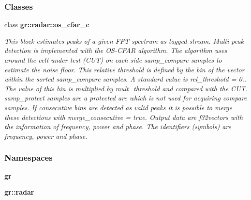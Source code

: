 \subsubsection*{Classes}
\begin{DoxyCompactItemize}
\item 
class {\bf gr\+::radar\+::os\+\_\+cfar\+\_\+c}
\begin{DoxyCompactList}\small\item\em This block estimates peaks of a given F\+FT spectrum as tagged stream. Multi peak detection is implemented with the O\+S-\/\+C\+F\+AR algorithm. The algorithm uses around the cell under test (C\+UT) on each side samp\+\_\+compare samples to estimate the noise floor. This relative threshold is defined by the bin of the vector within the sorted samp\+\_\+compare samples. A standard value is rel\+\_\+threshold = 0.. The value of this bin is multiplied by mult\+\_\+threshold and compared with the C\+UT. samp\+\_\+protect samples are a protected are which is not used for acquiring compare samples. If consecutive bins are detected as valid peaks it is possible to merge these detections with merge\+\_\+consecutive = true. Output data are f32vectors with the information of frequency, power and phase. The identifiers (symbols) are \textquotesingle{}frequency\textquotesingle{}, \textquotesingle{}power\textquotesingle{} and \textquotesingle{}phase\textquotesingle{}. \end{DoxyCompactList}\end{DoxyCompactItemize}
\subsubsection*{Namespaces}
\begin{DoxyCompactItemize}
\item 
 {\bf gr}
\item 
 {\bf gr\+::radar}
\end{DoxyCompactItemize}

